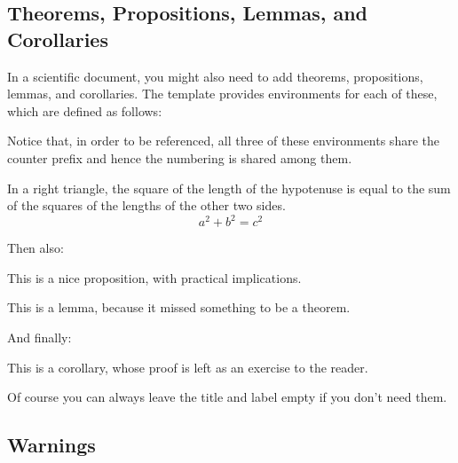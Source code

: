 \documentclass[../main.tex]{subfiles}
\begin{document}
\pagebreak
\subsection{Theorems, Propositions, Lemmas, and Corollaries}

In a scientific document, you might also need to add theorems, propositions, lemmas, and corollaries. The template provides environments for each of these, which are defined as follows:

\begin{center}
\end{center}

Notice that, in order to be referenced, all three of these environments share
the counter prefix  and hence the numbering is shared among them.\\

\begin{theorem}
    In a right triangle, the square of the length of the hypotenuse is equal to the sum of the squares of the lengths of the other two sides.
    \begin{equation*}
        a^2 + b^2 = c^2
    \end{equation*}
\end{theorem}

Then also:

\begin{proposition}
	This is a nice proposition, with practical implications.
\end{proposition}

\begin{lemma}
	This is a lemma, because it missed something to be a theorem.
\end{lemma}

And finally:

\begin{corollary}
	This is a corollary, whose proof is left as an exercise to the reader.
\end{corollary}

Of course you can always leave the title and label empty if you don't need them.

\pagebreak
\subsection{Warnings}
\end{document}
